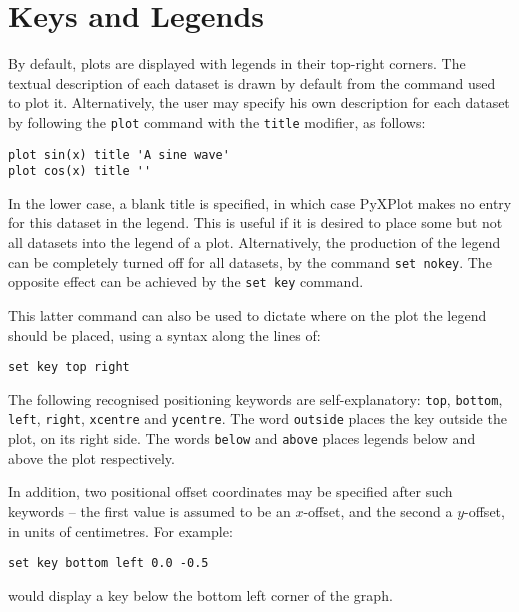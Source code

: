 \section{Keys and Legends}

By default, plots are displayed with legends in their top-right corners. The
textual description of each dataset is drawn by default from the command used
to plot it. Alternatively, the user may specify his own description for each
dataset by following the \texttt{plot} command with the \texttt{title}
modifier, as follows:

\begin{verbatim}
plot sin(x) title 'A sine wave'
plot cos(x) title ''
\end{verbatim}

In the lower case, a blank title is specified, in which case PyXPlot makes no
entry for this dataset in the legend. This is useful if it is desired to place
some but not all datasets into the legend of a plot.  Alternatively, the
production of the legend can be completely turned off for all datasets, by the
command \texttt{set nokey}. The opposite effect can be achieved by the
\texttt{set key} command.

This latter command can also be used to dictate where on the plot the legend
should be placed, using a syntax along the lines of:

\begin{verbatim}
set key top right
\end{verbatim}

The following recognised positioning keywords are self-explanatory:
\texttt{top}, \texttt{bottom}, \texttt{left}, \texttt{right}, \texttt{xcentre}
and \texttt{ycentre}. The word \texttt{outside} places the key outside the
plot, on its right side. The words \texttt{below} and \texttt{above} places
legends below and above the plot respectively.

In addition, two positional offset coordinates may be specified after such
keywords -- the first value is assumed to be an $x$-offset, and the second a
$y$-offset, in units of centimetres. For example:

\begin{verbatim}
set key bottom left 0.0 -0.5
\end{verbatim}

\noindent would display a key below the bottom left corner of the graph.

